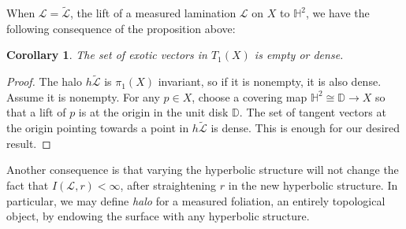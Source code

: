 \documentclass[11pt]{article} %
\theoremstyle{plain}
\newtheorem{cor}[thm]{Corollary}
\theoremstyle{definition}
\numberwithin{equation}{section}
\begin{document}
When $\mathcal{L}=\widetilde{\mathcal{L}}$, the lift of a measured lamination $\mathcal{L}$ on $X$ to $\mathbb{H}^2$, we have the following consequence of the proposition above:
\begin{cor}\label{cor:dense}
The set of exotic vectors in $T_1(X)$ is empty or dense.
\end{cor}
\begin{proof}
The halo $h\tilde{\mathcal{L}}$ is $\pi_1(X)$ invariant, so if it is nonempty, it is also dense. Assume it is nonempty. For any $p\in X$, choose a covering map $\mathbb{H}^2\cong\mathbb{D}\to X$ so that a lift of $p$ is at the origin in the unit disk $\mathbb{D}$. The set of tangent vectors at the origin pointing towards a point in $h\tilde{\mathcal{L}}$ is dense. This is enough for our desired result.
\end{proof}
Another consequence is that varying the hyperbolic structure will not change the fact that $I(\mathcal{L},r)<\infty$, after straightening $r$ in the new hyperbolic structure. In particular, we may define \emph{halo} for a measured foliation, an entirely topological object, by endowing the surface with any hyperbolic structure.
\end{document}
